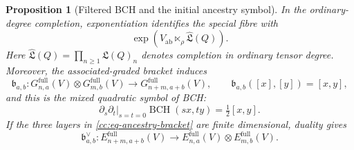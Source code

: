 \documentclass[10pt,reqno]{amsart}
\theoremstyle{plain}
\newtheorem{proposition}[theorem]{Proposition}
\theoremstyle{definition}
\theoremstyle{remark}
\begin{document}
\begin{proposition}[Filtered BCH and the initial ancestry symbol]
In the ordinary-degree completion, exponentiation identifies the special
fibre with
\begin{equation}
 \exp\!\left(V_{\mathrm{ab}}\ltimes_\rho\widehat{{\mathfrak L}}(Q)\right).
 \label{cc:eq-special-fibre-group}
\end{equation}
Here
\(\widehat{{\mathfrak L}}(Q)=\prod_{n\geq1}{\mathfrak L}(Q)_n\) denotes completion in
ordinary tensor degree.
Moreover, the associated-graded bracket induces
\begin{equation}
 \mathfrak b_{a,b}:G^{\mathrm{full}}_{n,a}(V)\otimes
 G^{\mathrm{full}}_{m,b}(V)
 \longrightarrow G^{\mathrm{full}}_{n+m,a+b}(V),
 \qquad \mathfrak b_{a,b}([x],[y])=[x,y],
 \label{cc:eq-ancestry-bracket}
\end{equation}
and this is the mixed quadratic symbol of BCH:
\begin{equation}
 \left.\partial_s\partial_t\right|_{s=t=0}
 {\operatorname{BCH}}(sx,ty)=\tfrac12[x,y].
 \label{cc:eq-bch-mixed-hessian}
\end{equation}
If the three layers in \eqref{cc:eq-ancestry-bracket} are finite
dimensional, duality gives
\begin{equation}
 \mathfrak b_{a,b}^{\vee}:E^{\mathrm{full}}_{n+m,a+b}(V)
 \longrightarrow E^{\mathrm{full}}_{n,a}(V)\otimes
 E^{\mathrm{full}}_{m,b}(V).
 \label{cc:eq-ancestry-cobracket}
\end{equation}
\end{proposition}
\end{document}
